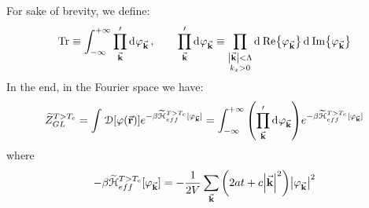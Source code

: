 \documentclass[../main/main.tex]{subfiles}
\begin{document}
For sake of brevity, we define:
\begin{equation}
  \Tr \equiv \int_{-\infty }^{+\infty } \prod_{\va{k}}'  \dd[]{\varphi _{\va{k}}}, \qquad
   \prod_{\va{k}}' \dd[]{\varphi _{\va{k}}} \equiv \prod_{\substack{ \abs{\va{k}} < \Lambda   \\ k_z >0 } }^{}   \dd[]{\Re {\varphi _{\va{k}}}}  \dd[]{\Im {\varphi _{\va{k}}}}
\end{equation}
In the end,  in the Fourier space we have:
\begin{equation}
  \widetilde{Z} _{GL}^{T>T_c} =   \int_{}^{} \mathcal{D} \qty[\varphi (\va{r})]
  e^{- \beta \widetilde{\mathcal{H}}_{eff}^{T>T_c} [\varphi _{\va{k}}] } =
   \int_{- \infty }^{+ \infty }  \qty( \prod_{\va{k}}'  \dd[]{\varphi _{\va{k}}})
  e^{- \beta \widetilde{\mathcal{H}}_{eff}^{T>T_c} [\varphi _{\va{k}}] }
  \label{eq:18_9}
\end{equation}
where
\begin{equation}
  - \beta \widetilde{\mathcal{H}}_{eff}^{T>T_c} [\varphi _{\va{k}}] = - \frac{1}{2V} \sum_{\va{k}}^{} \qty(2at+c \abs{\va{k}}^2 ) \abs{\varphi _{\va{k}}}^2
\end{equation}
\end{document}
